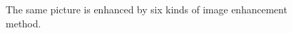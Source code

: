 \documentclass[a4paper]{article}
\begin{document}
\begin{figure}
{	} 
	\caption{The same picture is enhanced by six kinds of image enhancement method.} 
	\label{p1} %
\end{figure}
\end{document}
